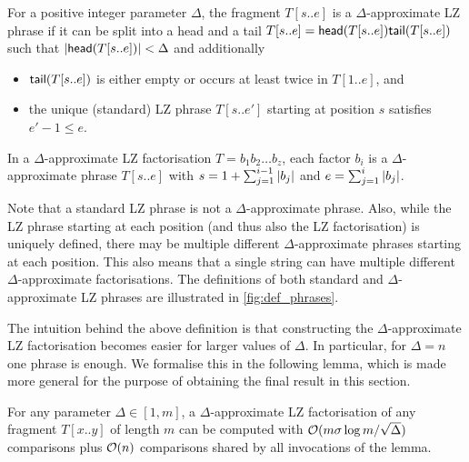 \begin{definition}
For a positive integer parameter $\Delta$, the fragment $T[s..e]$ is a $\Delta$-approximate
LZ phrase if it can be split into a head and a tail
$T[s..e]=\textsf{head}(T[s..e])\textsf{tail}(T[s..e])$ such that $\left\lvert\textsf{head}(T[s..e])\right\rvert < \Delta$ and additionally
\begin{itemize}
\item $\textsf{tail}(T[s..e])$ is either empty or occurs at least twice in $T[1..e]$, and
\item the unique (standard) LZ phrase $T[s..e']$ starting at position $s$ satisfies $e'-1\leq e$.
\end{itemize}
In a $\Delta$-approximate LZ factorisation $T = b_1b_2\dots b_z$, each factor $b_i$ is a $\Delta$-approximate phrase $T[s..e]$ with $s = 1+\sum_{j = 1}^{i - 1} \left\lvert b_j\right\rvert$ and $e = \sum_{j = 1}^{i} \left\lvert b_j\right\rvert$.
\end{definition}
Note that a standard LZ phrase is not a $\Delta$-approximate phrase. Also, while the LZ phrase starting at each position (and thus also the LZ factorisation) is uniquely defined, there may be multiple different $\Delta$-approximate phrases starting at each position. This also means that a single string can have multiple different $\Delta$-approximate factorisations. 
The definitions of both standard and $\Delta$-approximate LZ phrases are illustrated in \cref{fig:def_phrases}.
%
%


The intuition behind the above definition is that constructing the $\Delta$-approximate LZ factorisation becomes easier for larger
values of $\Delta$. In particular, for $\Delta=n$ one phrase is enough. We formalise this in the following lemma,
which is made more general for the purpose of obtaining the final result in this section.

\begin{lemma}
\label{lem:compute}
For any parameter $\Delta \in [1, m]$, a $\Delta$-approximate LZ factorisation of any fragment $T[x..y]$ of length $m$ can be
computed with $\mathcal{O}(m\sigma\log m/\sqrt{\Delta})$ comparisons plus $\mathcal{O}(n)$ comparisons shared by all invocations of the lemma.
\end{lemma}

